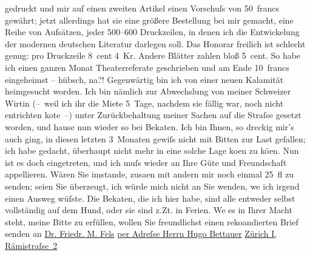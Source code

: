 \begin{ledgroupsized}[t]{13cm}
               gedruckt und mir auf einen zweiten Artikel einen Vorschuſs von 50 francs gewährt;
               jetzt allerdings hat sie eine größere Bestellung bei mir gemacht, eine Reihe von
               Aufsätzen, jeder 500–600 Druckzeilen, in denen ich die Entwickelung der modernen
               deutschen Literatur darlegen soll. Das Honorar freilich ist schlecht genug: pro
               Druckzeile 8 cent 4 Kr. Andere Blätter zahlen bloß 5 cent. So habe ich einen ganzen
               Monat Theaterreferate geschrieben und am Ende 10 francs eingeheimst – hübsch,
               na?!\pend
           \pstart
           {\pb}Gegenwärtig bin ich von einer neuen Kalamität
               heimgesucht worden. Ich bin nämlich zur Abwechslung von meiner Schweizer Wirtin (– weil ich ihr die Miete 5 Tage, nachdem sie fällig war, noch nicht
               entrichten ko{\geminationn}te –) unter Zurückbehaltung meiner Sachen
               auf die Straſse gesetzt worden, und hause nun wieder so bei Beka{\geminationn}ten. Ich bin Ihnen, so dreckig mir’s auch ging, in
               diesen letzten 3 Monaten gewiſs nicht mit Bitten zur Last gefallen; ich habe gedacht,
               überhaupt nicht mehr in eine solche Lage ko{\geminationm}en zu kö{\geminationn}en. Nun ist es doch eingetreten, und ich muſs wieder an
               Ihre Güte und Freundschaft appellieren. Wären Sie imstande, zusa{\geminationm}en mit andern mir noch einmal 25 fl zu senden; seien
               Sie überzeugt, ich würde mich nicht an Sie wenden, we{\geminationn}
               ich irgend einen Ausweg wüſste. Die Beka{\geminationn}ten, die ich
               hier habe, sind alle entweder selbst vollständig auf dem Hund, oder sie sind z.Zt. in
               Ferien. We{\geminationn} es in Ihrer Macht steht, meine Bitte zu
               erfüllen, wollen Sie freundlichst einen reko{\geminationm}andierten
               Brief senden an\pend
           \pstart
           \centering{}\uline{Dr. Friedr. M. Fels}\pend
           \pstart
           \noindent{}\centering{}\uline{per Adreſse Herrn Hugo
                     Bettauer}\pend
           \pstart
           \noindent{}\raggedleft{}\uline{Zürich I, Rämistraſse 2}\pend
           \pstart

\end{ledgroupsized}
